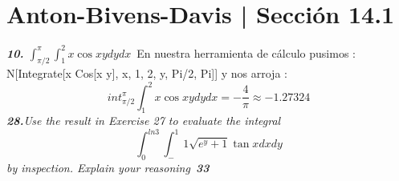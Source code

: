 \documentclass[a4paper,12pt]{article}
\begin{document}
	\section{Anton-Bivens-Davis | Sección 14.1}
	\textit{\textbf{10.} $\int^{\pi}_{\pi / 2}\int^2_1 x \cos xy dy dx$}\
En nuestra herramienta de cálculo pusimos :
N[Integrate[x Cos[x y], {x, 1, 2}, {y, Pi/2, Pi}]] y nos arroja :
\[int^{\pi}_{\pi /2}\int^2_1 x \cos xy dy dx = - \dfrac{4}{\pi} \approx -1.27324\]
\textit{\textbf{28.}Use the result in Exercise 27 to evaluate the integral \[\int^{ln 3}_{0} \int^1_-1 \sqrt{e^y + 1}\tan x dx dy\]by inspection. Explain your reasoning}\
\textit{\textbf{33}}
\end{document}
